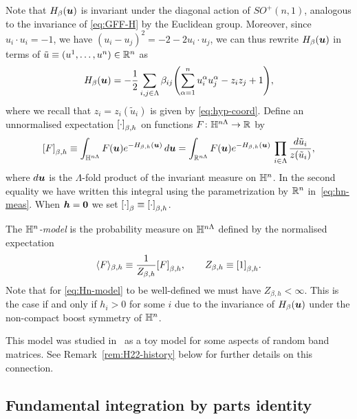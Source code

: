 \documentclass[11pt,a4paper]{article}
\let\originalleft\left
\let\originalright\right
\renewcommand{\left}{\mathopen{}\mathclose\bgroup\originalleft}
\renewcommand{\right}{\aftergroup\egroup\originalright}
\begin{document}
Note that $H_{\beta}(\boldsymbol{u})$ is invariant under the diagonal action of
$SO^+(n,1)$, analogous to the invariance of \eqref{eq:GFF-H} by the
Euclidean group.  Moreover, since $u_i\cdot u_i=-1$, we have
$(u_{i}-u_{j})^{2} = -2-2u_{i}\cdot u_{j}$, we can thus rewrite
$H_{\beta}(\boldsymbol{u})$ in terms of
$\tilde u \equiv (u^{1},\dots, u^{n})\in\mathbb{R}^{n}$ as
\begin{equation}
  \label{eq:H-Hn1}
  H_{\beta}(\V{u}) = -\frac{1}{2}
  \sum_{i,j\in\Lambda}\beta_{ij}\left(\sum_{\alpha=1}^{n}u_{i}^{\alpha}u_{j}^{\alpha}-z_{i}z_{j}+1\right),
\end{equation}
where we recall that $z_{i}=z_{i}(\tilde u_{i})$ is given by
\eqref{eq:hyp-coord}. Define an unnormalised expectation
$\cb{\cdot}_{\beta,h}$ on functions $F\colon \mathbb{H}^{n\Lambda}\to \mathbb{R}$ by
\begin{equation}
  \label{eq:unex-hn}
  \cb{F}_{\beta,h} \bydef
  \int_{\HH^{n\Lambda}}F(\V{u})e^{-H_{\beta,h}(\V{u})}\,d\V{u} =
  \int_{\R^{n\Lambda}} F(\V{u})e^{-H_{\beta,h}(\V{u})}\,
  \prod_{i\in\Lambda}\frac{d\tilde u_{i}}{z(\tilde u_{i})},
\end{equation}
where $d\boldsymbol{u}$ is the $\Lambda$-fold product of the invariant measure on
$\mathbb{H}^{n}$. In the second equality we have written this integral using
the parametrization by $\mathbb{R}^{n}$ in~\eqref{eq:hn-meas}.  When $\boldsymbol{h}=\boldsymbol{0}$ we
set $\cb{\cdot}_{\beta}\bydef \cb{\cdot}_{\beta,h}$.

The \emph{$\mathbb{H}^{n}$-model} is the probability measure on
$\mathbb{H}^{n\Lambda}$ defined by the normalised expectation
\begin{equation}
  \label{eq:Hn-model}
  \avg{F}_{\beta,h} \bydef \frac{1}{Z_{\beta,h}}\cb{F}_{\beta,h},
  \qquad Z_{\beta,h} \bydef \cb{1}_{\beta,h}.
\end{equation}
Note that for \eqref{eq:Hn-model} to be well-defined we must have
$Z_{\beta,h}<\infty$.  This is the case if and only if $h_{i}>0$ for
some $i$ due to the invariance of $H_{\beta}(\boldsymbol{u})$ under the
non-compact boost symmetry of $\mathbb{H}^{n}$.

\begin{remark}
  \label{rem:Hn-history}
  This model was studied in~\cite{MR2104878} as a toy model
  for some aspects of random band matrices. See
  Remark~\ref{rem:H22-history} below for further details on this
  connection.
\end{remark}

\subsection{Fundamental integration by parts identity}
\end{document}
